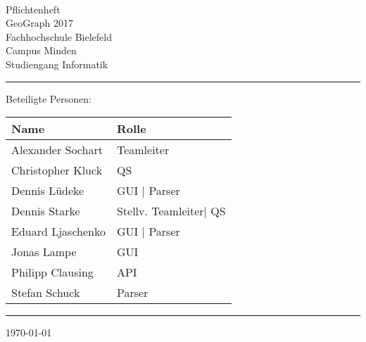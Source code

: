 


\begin{titlepage}
   \mbox{}\vspace{5\baselineskip}\\
   \sffamily\huge
   \centering
   {\Huge Pflichtenheft} \\
   \normalsize GeoGraph 2017
   \vspace{3\baselineskip}\\
   \rmfamily\Large
  Fachhochschule Bielefeld \\
  Campus Minden \\
  Studiengang Informatik
   \vspace{1\baselineskip}\\
\noindent\rule{15cm}{0.3pt}
Beteiligte Personen:
\begin{table}[H]
	\tablestyle
	\begin{tabular}{*{2}{v{0.45\textwidth}}}
		\hline
		\textbf{Name} &
		\textbf{Rolle} \tabularnewline
		\hline
		Alexander Sochart & Teamleiter  \tabularnewline
		Christopher Kluck & QS\tabularnewline
		Dennis Lüdeke & GUI | Parser\tabularnewline
		Dennis Starke  &  Stellv. Teamleiter| QS\tabularnewline
		Eduard Ljaschenko & GUI | Parser\tabularnewline
		Jonas Lampe & GUI \tabularnewline
		Philipp Clausing  & API \tabularnewline
		Stefan Schuck & Parser\tabularnewline
	\end{tabular}
\end{table}
   \noindent\rule{15cm}{0.4pt}

   \today
\end{titlepage}

